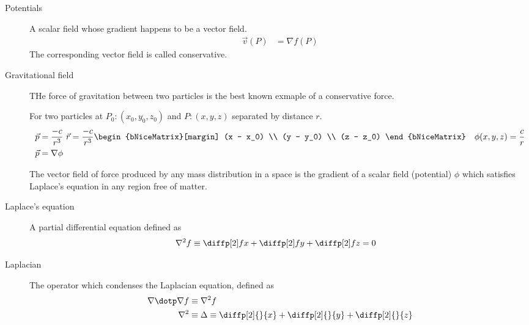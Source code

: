 \begin{description}
    \item[Potentials] A scalar field whose gradient happens to be a vector field.
          \begin{align}
              \vec{v}(P) & = \nabla f(P)
          \end{align}
          The corresponding vector field is called conservative.

    \item[Gravitational field] THe force of gravitation between two particles is the best
          known exmaple of a conservative force. \par
          For two particles at $ P_0: (x_0, y_0, z_0) $ and $ P: (x, y, z) $ separated by
          distance $ r $.
          \begin{align}
              \vec{p}                                      & = \frac{-c}{r^3}\ \vec{r}
              = \frac{-c}{r^3} \begin{bNiceMatrix}[margin]
                                   (x - x_0) \\ (y - y_0) \\ (z - z_0)
                               \end{bNiceMatrix} &
              \phi(x, y, z)                                & = \frac{c}{r}             \\
              \vec{p}                                      & = \nabla \phi
          \end{align}

          The vector field of force produced by any mass distribution in a space is the
          gradient of a scalar field (potential) $ \phi $ which satisfies Laplace's
          equation in any region free of matter.

    \item[Laplace's equation] A partial differential equation defined as
          \begin{align}
              \nabla^2 f & \equiv \diffp[2] fx + \diffp[2] fy + \diffp[2] fz = 0
          \end{align}

    \item[Laplacian] The operator which condenses the Laplacian equation, defined as
          \begin{align}
              \nabla \dotp \nabla f & \equiv \nabla^2 f              \\
              \nabla^2              & \equiv \Delta \equiv \diffp[2]
              {}{x} + \diffp[2] {}{y} + \diffp[2] {}{z}
          \end{align}
\end{description}

